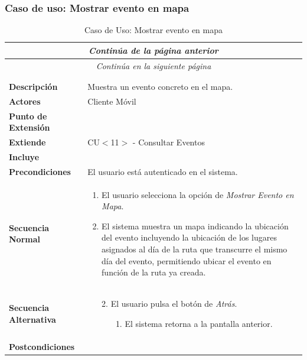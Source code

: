 \subsubsection*{Caso de uso: Mostrar evento en mapa }
\begin{longtable}{| p{4cm} | p{10cm} |}
\endfirsthead
\multicolumn{2}{c}{\textit{Continúa de la página anterior}}\\[12pt]
\hline
\endhead
\hline
\multicolumn{2}{c}{\textit{Continúa en la siguiente página}} \\
\endfoot
\hline
\caption{Caso de Uso: Mostrar evento en mapa}\label{fig:1}\\
\endlastfoot


\hline
\multicolumn{2}{|c|}{\textbf{CU$<$12$>$ - Mostrar Evento en Mapa}} \\

\hline
\textbf{Descripción} &
Muestra un evento concreto en el mapa.\\

\hline
\textbf{Actores} &
Cliente Móvil\\

\hline
\textbf{Punto de Extensión} &
\\

\hline
\textbf{Extiende} &
CU$<$11$>$ - Consultar Eventos
\\

\hline
\textbf{Incluye} &
\\

\hline
\textbf{Precondiciones} &
El usuario está autenticado en el sistema.\\

\hline
\textbf{Secuencia Normal} &\mbox{}\par\vspace{-\baselineskip}
\begin{enumerate}[leftmargin=0.7cm, topsep=0.1cm]
\item El usuario selecciona la opción de \textit{Mostrar Evento en Mapa}.
\item El sistema muestra un mapa indicando la ubicación del evento incluyendo la ubicación de los lugares asignados al día de la ruta que transcurre el mismo día del evento, permitiendo ubicar el evento en función de la ruta ya creada.
\end{enumerate}
\\
\hline
\textbf{Secuencia Alternativa} &\mbox{}\par\vspace{-\baselineskip}
\begin{enumerate}[leftmargin=0.9cm, topsep=0.1cm]
\item[2.] El usuario pulsa el botón de \textit{Atrás}.
	\begin{itemize}
	\item[1.] El sistema retorna a la pantalla anterior.
	\end{itemize}
\end{enumerate}
\\

\hline
\textbf{Postcondiciones} & \\
\hline
\end{longtable}



